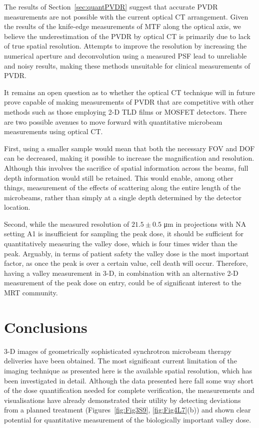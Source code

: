 	
	The results of Section~\ref{sec:quantPVDR} suggest that accurate PVDR measurements are not possible with the current optical CT arrangement. Given the results of the knife-edge measurements of MTF along the optical axis, we believe the underestimation of the PVDR by optical CT is primarily due to lack of true spatial resolution. Attempts to improve the resolution by increasing the numerical aperture and deconvolution using a measured PSF lead to unreliable and noisy results, making these methods unsuitable for clinical measurements of PVDR.   
	
	It remains an open question as to whether the optical CT technique will in future prove capable of making measurements of PVDR that are competitive with other methods such as those employing 2-D TLD films or MOSFET detectors. There are two possible avenues to move forward with quantitative microbeam measurements using optical CT. 
	
	First, using a smaller sample would mean that both the necessary FOV and DOF can be decreased, making it possible to increase the magnification and resolution. Although this involves the sacrifice of spatial information across the beams, full depth information would still be retained. This would enable, among other things, measurement of the effects of scattering along the entire length of the microbeams, rather than simply at a single depth determined by the detector location. 
	
	Second, while the measured resolution of $21.5 \pm 0.5$ \si{\um} in projections with NA setting A1 is insufficient for sampling the peak dose, it should be sufficient for quantitatively measuring the valley dose, which is four times wider than the peak. Arguably, in terms of patient safety the valley dose is the most important factor, as once the peak is over a certain value, cell death will occur. Therefore, having a valley measurement in 3-D, in combination with an alternative 2-D measurement of the peak dose on entry, could be of significant interest to the MRT community.
	
	\section{Conclusions}
	3-D images of geometrically sophisticated synchrotron microbeam therapy deliveries have been obtained. The most significant current limitation of the imaging technique as presented here is the available spatial resolution, which has been investigated in detail. Although the data presented here fall some way short of the dose quantification needed for complete verification, the measurements and visualisations have already demonstrated their utility by detecting deviations from a planned treatment (Figures~\ref{fig:Fig3S9}, \ref{fig:Fig4L7}(b)) and shown clear potential for quantitative measurement of the biologically important valley dose.
	
	
	
	
	
